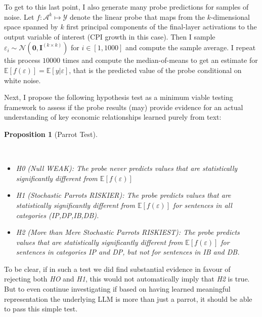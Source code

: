 \documentclass[
  letterpaper,
  DIV=11,
  numbers=noendperiod]{scrartcl}
\providecommand{\tightlist}{%
  \setlength{\itemsep}{0pt}\setlength{\parskip}{0pt}}\usepackage{longtable,booktabs,array}
\theoremstyle{plain}
\newtheorem{proposition}{Proposition}[section]
\theoremstyle{remark}
\begin{document}
To get to this last point, I also generate many probe predictions for
samples of noise. Let \(f: \mathcal{A}^k \mapsto \mathcal{Y}\) denote
the linear probe that maps from the \(k\)-dimensional space spanned by
\(k\) first principal components of the final-layer activations to the
output variable of interest (CPI growth in this case). Then I sample
\(\varepsilon_i \sim \mathcal{N}(\mathbf{0},\mathbf{I}^{(k \times k)})\)
for \(i \in [1,1000]\) and compute the sample average. I repeat this
process \(10000\) times and compute the median-of-means to get an
estimate for \(\mathbb{E}[f(\varepsilon)]=\mathbb{E}[y|\varepsilon]\),
that is the predicted value of the probe conditional on white noise.

Next, I propose the following hypothesis test as a minimum viable
testing framework to assess if the probe results (may) provide evidence
for an actual understanding of key economic relationships learned purely
from text:

\begin{proposition}[Parrot
Test]\protect\hypertarget{prp-line}{}\label{prp-line}

~

\begin{itemize}
\tightlist
\item
  \emph{H0} (Null \emph{WEAK}): The probe never predicts values that are
  statistically significantly different from
  \(\mathbb{E}[f(\varepsilon)]\)
\item
  \emph{H1} (Stochastic Parrots \emph{RISKIER}): The probe predicts
  values that are statistically significantly different from
  \(\mathbb{E}[f(\varepsilon)]\) for sentences in all categories
  (IP,DP,IB,DB).
\item
  \emph{H2} (More than Mere Stochastic Parrots \emph{RISKIEST}): The
  probe predicts values that are statistically significantly different
  from \(\mathbb{E}[f(\varepsilon)]\) for sentences in categories IP and
  DP, but not for sentences in IB and DB.
\end{itemize}

\end{proposition}

To be clear, if in such a test we did find substantial evidence in
favour of rejecting both \emph{HO} and \emph{H1}, this would not
automatically imply that \emph{H2} is true. But to even continue
investigating if based on having learned meaningful representation the
underlying LLM is more than just a parrot, it should be able to pass
this simple test.
\end{document}
